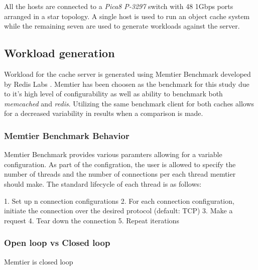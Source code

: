 All the hosts are connected to a \textit{Pica8 P-3297} switch with 48 1Gbps ports arranged in a star topology. A single host is used to run an object cache system while the remaining seven are used to generate workloads against the server.

\subsection{Workload generation}
Workload for the cache server is generated using Memtier Benchmark developed by Redis Labs \cite{memtier}. Memtier has been choosen as the benchmark for this study due to it's high level of configurability as well as ability to benchmark both \textit{memcached} and \textit{redis}. Utilizing the same benchmark client for both caches allows for a decreased variability in results when a comparison is made.

\subsubsection{Memtier Benchmark Behavior}
Memtier Benchmark provides various paramters allowing for a variable configuration. As part of the configration, the user is allowed to specify the number of threads and the number of connections per each thread memtier should make. The standard lifecycle of each thread is as follows:

1. Set up n connection configurations
2. For each connection configuration, initiate the connection over the desired protocol (default: TCP)
3. Make a request
4. Tear down the connection
5. Repeat iterations

\subsubsection{Open loop vs Closed loop}
Memtier is closed loop




